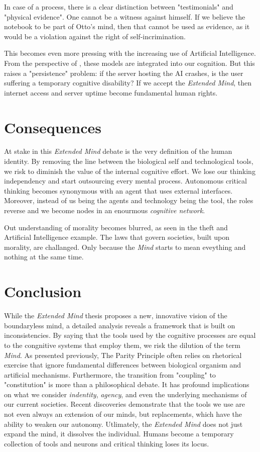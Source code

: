 \documentclass[12pt]{article}
\begin{document}
In case of a process, there is a clear distinction between "testimonials" and "physical evidence".
One cannot be a witness against himself. If we believe the notebook to be part of Otto's mind, 
then that cannot be used as evidence, as it would be a violation against the right 
of self-incrimination.

This becomes even more pressing with the increasing use of Artificial Intelligence. From the 
perspective of \textcite{clark1998extended}, these models are integrated into our cognition. But this 
raises a "persistence" problem: if the server hosting the AI crashes, is the user suffering 
a temporary cognitive disability? If we accept the \textit{Extended Mind}, then internet access
and server uptime become fundamental human rights.

\section{Consequences}

At stake in this \textit{Extended Mind} debate is the very definition of the human identity.
By removing the line between the biological self and technological tools, we risk to diminish the
value of the internal cognitive effort. We lose our thinking independency and start outsourcing
every mental process. Autonomous critical thinking becomes synonymous with an agent that uses external 
interfaces. Moreover, instead of us being the agents and technology being the tool, the roles
reverse and we become nodes in an enourmous \textit{cognitive network}.

Out understanding of morality becomes blurred, as seen in the theft and Artificial Intelligence 
example. The laws that govern societies, built upon morality, are challanged. Only 
because the \textit{Mind} starts to mean eveything and nothing at the same time.

\section{Conclusion}

While the \textit{Extended Mind} thesis proposes a new, innovative vision of the boundaryless mind, 
a detailed analysis reveals a framework that is built on inconsistencies. By saying that the tools 
used by the cognitive processes are equal to the congnitive systems that employ them, we risk 
the dilution of the term \textit{Mind}. As presented previously, The Parity Principle 
often relies on rhetorical exercise that ignore fundamental differences between biological organism 
and artificial mechanisms. 
Furthermore, the transition from "coupling" to "constitution" is more than a philosophical debate.
It has profound implications on what we consider \textit{indentity}, \textit{agency}, and even the 
underlying mechanisms of our current societies. Recent discoveries demonstrate that the tools 
we use are not even always an extension of our minds, but replacements, which have the ability to 
weaken our autonomy.
Utlimately, the \textit{Extended Mind} does not just expand the mind, it dissolves the individual.
Humans become a temporary collection of tools and neurons and critical thinking loses its locus.


\printbibliography
\end{document}
